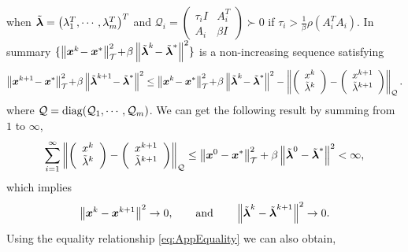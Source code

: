 \documentclass{mcom-l}
\theoremstyle{definition}
\theoremstyle{remark}
\numberwithin{equation}{section}
\begin{document}
when $ \tilde{{\mbox{\boldmath $\lambda$}}} = \left( \lambda_1^T,\cdots,\lambda_m^T \right)^T $ and ${\mathcal{Q}}_i = \left( \begin{array}{cc}\tau_i I\!&\!A_i^T\\ A_i\!&\!\beta I\end{array} \right)\succ 0$ if $\tau_i > \frac{1}{\beta} \rho (A_i^T A_i) $. In summary $\{\left\|{{\mbox{\boldmath $x$}}}^k \!- {{\mbox{\boldmath $x$}}}^*\right\|_{\mathcal{T}}^2 \!+\! \beta \left\| \tilde{{\mbox{\boldmath $\lambda$}}}^k \!- \tilde{{\mbox{\boldmath $\lambda$}}}^* \right\|^2\}$ is a non-increasing sequence satisfying
{\small$$
\left\|{{\mbox{\boldmath $x$}}}^{k+1} \!- {{\mbox{\boldmath $x$}}}^*\right\|_{\mathcal{T}}^2 \!+\! \beta \left\| \tilde{{\mbox{\boldmath $\lambda$}}}^{k+1} \!- \tilde{{\mbox{\boldmath $\lambda$}}}^* \right\|^2 \le \left\|{{\mbox{\boldmath $x$}}}^k \!- {{\mbox{\boldmath $x$}}}^*\right\|_{\mathcal{T}}^2 \!+\! \beta \left\| \tilde{{\mbox{\boldmath $\lambda$}}}^k \!- \tilde{{\mbox{\boldmath $\lambda$}}}^* \right\|^2 - \left\| \left( \begin{array}{c} x^k\\ \tilde{\lambda}^k \end{array} \right) - \left( \begin{array}{c} x^{k+1}\\ \tilde{\lambda}^{k+1} \end{array} \right) \right\|_{{\mathcal{Q}}}.
$$}
where ${\mathcal{Q}} = \hbox{diag}({\mathcal{Q}}_1,\cdots,{\mathcal{Q}}_m)$. We can get the following result by summing from $1$ to $\infty$,
$$
\sum_{i=1}^{\infty} \left\| \left( \begin{array}{c} x^k\\ \tilde{\lambda}^k \end{array} \right) - \left( \begin{array}{c} x^{k+1}\\ \tilde{\lambda}^{k+1} \end{array} \right) \right\|_{{\mathcal{Q}}} \le \left\|{{\mbox{\boldmath $x$}}}^0 - {{\mbox{\boldmath $x$}}}^*\right\|_{\mathcal{T}}^2 + \beta \left\| \tilde{{\mbox{\boldmath $\lambda$}}}^0 - \tilde{{\mbox{\boldmath $\lambda$}}}^* \right\|^2 < \infty,
$$
which implies
$$
\left\| {{\mbox{\boldmath $x$}}}^k - {{\mbox{\boldmath $x$}}}^{k+1} \right\|^2 \rightarrow 0,\qquad\hbox{and}\qquad \left\| \tilde{{\mbox{\boldmath $\lambda$}}}^k - \tilde{{\mbox{\boldmath $\lambda$}}}^{k+1} \right\|^2 \rightarrow 0.
$$
Using the equality relationship \eqref{eq:AppEquality} we can also obtain,
\end{document}
